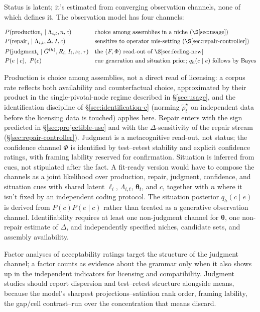 Status is latent; it's estimated from converging observation channels, none of
which defines it. The observation model has four channels:

\begin{align}
&P(\text{production}_i\mid\Lambda_{i,t},n,c)
  && \text{choice among assemblies in a niche (\S\ref{sec:usage})} \\
&P(\text{repair}_i\mid\Lambda_{i,t},\Delta,I,c)
  && \text{sensitive to operator mis-setting (\S\ref{sec:repair-controller})} \\
&P(\text{judgment}_i\mid \hat{G}^{(h)},R_i,I_i,\nu_i,\tau)
  && \text{the }(F,\Phi)\text{ read-out of \S\ref{sec:feeling-new}} \\
&P(e\mid c),\ P(c)
  && \text{cue generation and situation prior; }q_h(c\mid e)\text{ follows by Bayes}
\end{align}

Production is choice among assemblies, not a direct read of licensing: a corpus
rate reflects both availability and counterfactual choice, approximated by their
product in the single-pivotal-node regime described in \S\ref{sec:usage}, and the identification discipline of
\S\ref{sec:identification-c} (norming $\widetilde{\rho}_t^\star$ on independent data before
the licensing data is touched) applies here. Repair enters with the sign
predicted in \S\ref{sec:projectible-use} and with the $\Delta$-sensitivity of the
repair stream (\S\ref{sec:repair-controller}). Judgment is a metacognitive
read-out, not status; the confidence channel $\Phi$ is identified by
test--retest stability and explicit confidence ratings, with framing lability
reserved for confirmation. Situation is inferred from cues, not stipulated after
the fact. A fit-ready version would have to compose the channels as a joint likelihood over
production, repair, judgment, confidence, and situation cues with shared latent
$\ell_i$, $\Lambda_{i,t}$, $\boldsymbol{\theta}_t$, and $c$, together with $n$
where it isn't fixed by an independent coding protocol. The situation posterior
$q_h(c\mid e)$ is derived from $P(c)P(e\mid c)$ rather than treated as a
generative observation channel. Identifiability requires at least one
non-judgment channel for $\boldsymbol{\theta}$, one non-repair estimate of
$\Delta$, and independently specified niches, candidate sets, and assembly
availability.

Factor analyses of acceptability ratings target the structure of the judgment
channel; a factor counts as evidence about the grammar only when it also shows up
in the independent indicators for licensing and compatibility. Judgment studies
should report dispersion and test--retest structure alongside means, because the
model's sharpest projections--satiation rank order, framing lability, the
gap/cell contrast--run over the concentration that means discard.

